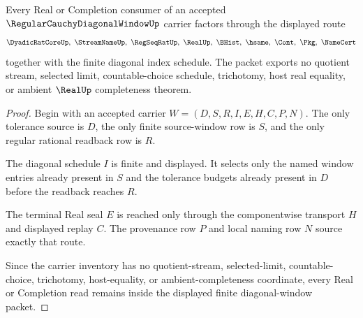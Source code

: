 \begin{theorem}
\label{thm:regular-cauchy-diagonal-window-nonescape}
Every Real or Completion consumer of an accepted $\RegularCauchyDiagonalWindowUp$ carrier factors through the displayed route
$$
\DyadicRatCoreUp,\ \StreamNameUp,\ \RegSeqRatUp,\ \RealUp,\ \BHist,\ \hsame,\ \Cont,\ \Pkg,\ \NameCert
$$
together with the finite diagonal index schedule. The packet exports no quotient stream, selected limit, countable-choice schedule, trichotomy, host real equality, or ambient $\RealUp$ completeness theorem.
\end{theorem}
\begin{proof}
Begin with an accepted carrier $W=(D,S,R,I,E,H,C,P,N)$. The only tolerance source is $D$, the only finite source-window row is $S$, and the only regular rational readback row is $R$.

The diagonal schedule $I$ is finite and displayed. It selects only the named window entries already present in $S$ and the tolerance budgets already present in $D$ before the readback reaches $R$.

The terminal Real seal $E$ is reached only through the componentwise transport $H$ and displayed replay $C$. The provenance row $P$ and local naming row $N$ source exactly that route.

Since the carrier inventory has no quotient-stream, selected-limit, countable-choice, trichotomy, host-equality, or ambient-completeness coordinate, every Real or Completion read remains inside the displayed finite diagonal-window packet.
\end{proof}




